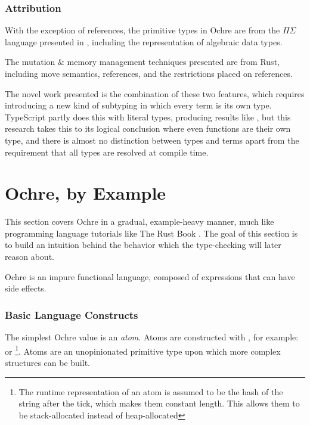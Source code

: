\documentclass[12pt,twoside]{report}
\begin{document}
\subsubsection{Attribution}
With the exception of references, the primitive types in Ochre are from the $\Pi\Sigma$ language presented in \cite{altenkirch2010pisigma}, including the representation of algebraic data types.

The mutation \& memory management techniques presented are from Rust, including move semantics, references, and the restrictions placed on references.

The novel work presented is the combination of these two features, which requires introducing a new kind of subtyping in which every term is its own type. TypeScript partly does this with literal types, producing results like , but this research takes this to its logical conclusion where even functions are their own type, and there is almost no distinction between types and terms apart from the requirement that all types are resolved at compile time.


\cleardoublepage
\section{Ochre, by Example}
\label{section:ochreexample}
This section covers Ochre in a gradual, example-heavy manner, much like programming language tutorials like The Rust Book \citep{RustProgrammingLanguagea}. The goal of this section is to build an intuition behind the behavior which the type-checking will later reason about.

Ochre is an impure functional language, composed of expressions that can have side effects.

\subsubsection{Basic Language Constructs}
The simplest Ochre value is an \textit{atom}. Atoms are constructed with , for example:  or \footnote{The runtime representation of an atom is assumed to be the hash of the string after the tick, which makes them constant length. This allows them to be stack-allocated instead of heap-allocated}. Atoms are an unopinionated primitive type upon which more complex structures can be built.
\end{document}
